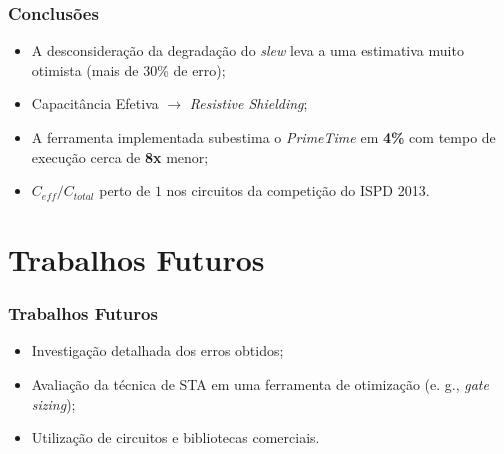 \documentclass[10pt,a4paper]{beamer}
\begin{document}
		\begin{frame}[t]
		\frametitle{Conclusões}
			\begin{itemize}
				\item A desconsideração da degradação do \textit{slew} leva a uma estimativa muito otimista (mais de 30\% de erro);
				
				\item Capacitância Efetiva $\to$ \textit{Resistive Shielding};
				
				\item A ferramenta implementada subestima o \textit{PrimeTime} em \textbf{4\%} com tempo de execução  cerca de \textbf{8x} menor;
				
				\item $C_{eff} / C_{total}$ perto de $1$ nos circuitos da competição do ISPD 2013.
			\end{itemize}
		\end{frame}
	
	\section{Trabalhos Futuros}
		
		\begin{frame}[t]
		\frametitle{Trabalhos Futuros}
			\begin{itemize}
				\item Investigação detalhada dos erros obtidos;
				
				\item Avaliação da técnica de STA em uma ferramenta de otimização (e. g., \textit{gate sizing});
				
				\item Utilização de circuitos e bibliotecas comerciais.
			\end{itemize}
		\end{frame}
		
	\section*{}
	\frame{\titlepage}
	
\end{document}
